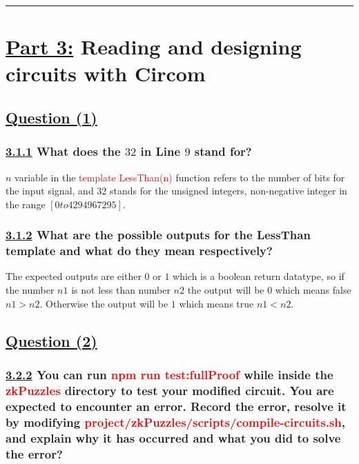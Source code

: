 \documentclass[letterpaper, 10 pt, conference]{ieeeconf}  %
\begin{document}
\noindent\rule{8cm}{0.4pt}




\section{\textbf{\underline{Part 3:}} Reading and designing circuits with Circom}

\subsection{\textbf{}\underline{Question (1)}}
\subsubsection{\textbf{\underline{3.1.1} What does the $32$ in Line $9$ stand for?}}

$n$ variable in the \textcolor{red}{template LessThan(n)} function refers to the number of bits for the input signal, and $32$ stands for the unsigned integers, non-negative integer in the range $[0 to 4294967295]$.

\subsubsection{\textbf{\underline{3.1.2} What are the possible outputs for the LessThan template and what do they mean respectively?}}

The expected outputs are either $0$ or $1$ which is a boolean return datatype, so if the number $n1$ is not less than number $n2$ the output will be $0$ which means false $n1 > n2$. Otherwise the output will be $1$ which means true $n1 < n2$.

\subsection{\textbf{\underline{Question (2)}}}

\subsubsection{\textbf{\underline{3.2.2} You can run \textcolor{red}{npm run test:fullProof} while inside the \textcolor{red}{zkPuzzles} directory to test your modified circuit. You are expected to encounter an error. Record the error, resolve it by modifying \textcolor{red}{project/zkPuzzles/scripts/compile-circuits.sh}, and explain why it has occurred and what you did to solve the error?}}
\end{document}
